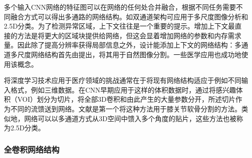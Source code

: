多个输入CNN网络的特征图可以在网络的任何处合并融合，根据不同任务需要不同融合方式可以得出多通路的网络结构。如双通道架构\cite{Kamnitsas2017}可应用于多尺度图像分析和2.5D分类。为了检测异常区域，上下文往往是一个重要的提示。增加上下文最直接的方法是将更大的区域块提供给网络，但这会显着增加网络的参数和内存需求量。因此除了提高分辨率获得局部信息之外，设计能添加上下文的网络结构：多通道多尺度网络结构首先由\cite{Farabet2013Learning}提出，将其用于自然图像分割。一些医学应用也成功地使用该概念\citep{Kamnitsas2017,Moeskops2016Automatic,Song2015Accurate,Yang2016Cascade}。

将深度学习技术应用于医疗领域的挑战通常在于将现有网络结构适应于例如不同输入格式，例如三维数据。在CNN早期应用于这样的体积数据时，通过将感兴趣体积（VOI）划分为切片，将全部3D卷积和由此产生的大量参数分开，所述切片作为不同的流馈送到网络。文献是第一个将这种方法用于膝关节软骨分割的方法。类似地，网络可以以多通道方式从3D空间中馈入多个角度的贴片\citep{Roth2014A}，这些方法也被称为2.5D分类。

\subsubsection{全卷积网络结构}
\label{sec:fully_arch}

